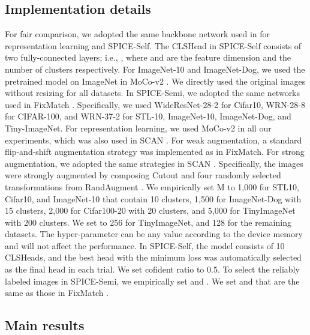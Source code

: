 \documentclass[10pt,twocolumn,letterpaper]{article}
\begin{document}
\subsection{Implementation details}
For fair comparison, we adopted the same backbone network used in \cite{IIC2019, Huang_2020_CVPR} for representation learning and SPICE-Self.
The CLSHead in SPICE-Self consists of two fully-connected layers; i.e., , where  and  are the feature dimension and the number of clusters respectively.
For ImageNet-10 and ImageNet-Dog, we used the pretrained model on ImageNet in MoCo-v2 \cite{He_2020_CVPR}.
We directly used the original images without resizing for all datasets.
In SPICE-Semi, we adopted the same networks used in FixMatch \cite{fixmatch}. Specifically, we used WideResNet-28-2 for Cifar10, WRN-28-8 for CIFAR-100, and WRN-37-2 for STL-10, ImageNet-10, ImageNet-Dog, and Tiny-ImageNet.
For representation learning, we used MoCo-v2 \cite{He_2020_CVPR} in all our experiments, which was also used in SCAN \cite{scan}.
For weak augmentation, a standard flip-and-shift augmentation strategy was implemented as in FixMatch.
For strong augmentation, we adopted the same strategies in SCAN \cite{scan}. Specifically, the images were strongly augmented by composing Cutout \cite{cutout} and four randomly selected transformations from RandAugment \cite{randaugent}.
We empirically set M to 1,000 for STL10, Cifar10, and ImageNet-10 that contain 10 clusters, 1,500 for ImageNet-Dog with 15 clusters, 2,000 for Cifar100-20 with 20 clusters, and 5,000 for TinyImageNet with 200 clusters. We set  to 256 for TinyImageNet, and 128 for the remaining datasets. The hyper-parameter  can be any value according to the device memory and will not affect the performance.
In SPICE-Self, the model consists of 10 CLSHeads, and the best head with the minimum loss was automatically selected as the final head in each trial.
We set cofident ratio  to 0.5.
To select the reliably labeled images in SPICE-Semi, we empirically set  and .
We set  and  that are the same as those in FixMatch \cite{fixmatch}.

\subsection{Main results}
\end{document}
